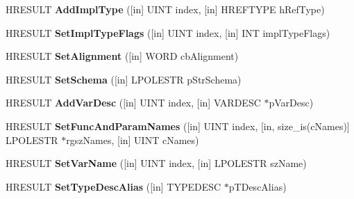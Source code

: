 \begin{DoxyCompactItemize}
\mbox{\label{interface_i_create_type_info_adfe9d3a9fcbb440b85676e2dc49ef17c}} 
H\+R\+E\+S\+U\+LT {\bfseries Add\+Impl\+Type} (\mbox{[}in\mbox{]} U\+I\+NT index, \mbox{[}in\mbox{]} H\+R\+E\+F\+T\+Y\+PE h\+Ref\+Type)
\item 
\mbox{\label{interface_i_create_type_info_aff29b538d50034284a7b899107508826}} 
H\+R\+E\+S\+U\+LT {\bfseries Set\+Impl\+Type\+Flags} (\mbox{[}in\mbox{]} U\+I\+NT index, \mbox{[}in\mbox{]} I\+NT impl\+Type\+Flags)
\item 
\mbox{\label{interface_i_create_type_info_a3d66af2f60bc05909c723e04ce0bf114}} 
H\+R\+E\+S\+U\+LT {\bfseries Set\+Alignment} (\mbox{[}in\mbox{]} W\+O\+RD cb\+Alignment)
\item 
\mbox{\label{interface_i_create_type_info_a8ed327531404e6308f1bfceeaee456ad}} 
H\+R\+E\+S\+U\+LT {\bfseries Set\+Schema} (\mbox{[}in\mbox{]} L\+P\+O\+L\+E\+S\+TR p\+Str\+Schema)
\item 
\mbox{\label{interface_i_create_type_info_af36216ba43bac7479ee3935f0d06da32}} 
H\+R\+E\+S\+U\+LT {\bfseries Add\+Var\+Desc} (\mbox{[}in\mbox{]} U\+I\+NT index, \mbox{[}in\mbox{]} V\+A\+R\+D\+E\+SC $\ast$p\+Var\+Desc)
\item 
\mbox{\label{interface_i_create_type_info_ae24083bbb11f230e3dbce1946aef0c65}} 
H\+R\+E\+S\+U\+LT {\bfseries Set\+Func\+And\+Param\+Names} (\mbox{[}in\mbox{]} U\+I\+NT index, \mbox{[}in, size\+\_\+is(c\+Names)\mbox{]} L\+P\+O\+L\+E\+S\+TR $\ast$rgsz\+Names, \mbox{[}in\mbox{]} U\+I\+NT c\+Names)
\item 
\mbox{\label{interface_i_create_type_info_a2fd4d443778f7b0031f7173469886d1d}} 
H\+R\+E\+S\+U\+LT {\bfseries Set\+Var\+Name} (\mbox{[}in\mbox{]} U\+I\+NT index, \mbox{[}in\mbox{]} L\+P\+O\+L\+E\+S\+TR sz\+Name)
\item 
\mbox{\label{interface_i_create_type_info_ac27d24936c580d09853e1c59ff2216e1}} 
H\+R\+E\+S\+U\+LT {\bfseries Set\+Type\+Desc\+Alias} (\mbox{[}in\mbox{]} T\+Y\+P\+E\+D\+E\+SC $\ast$p\+T\+Desc\+Alias)

\end{DoxyCompactItemize}
